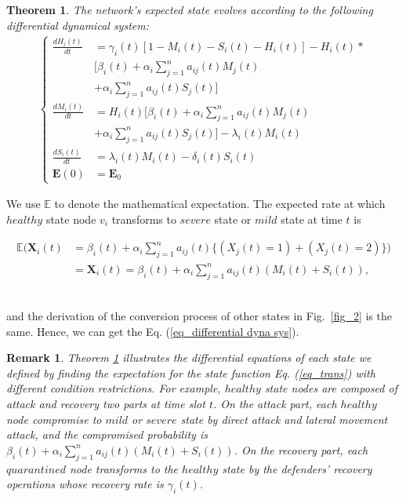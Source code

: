 \documentclass[lettersize,journal]{IEEEtran}
\newtheorem{theorem}{ \textbf{Theorem}}
\newtheorem{remark}{ \textbf{Remark}}
\begin{document}
\begin{theorem}\label{themo_1}
The network's expected state evolves according to the following differential dynamical system:
\begin{equation}\label{eq_differential dyna sys}
\begin{aligned}
 \begin{cases}
     \frac{dH_i(t)}{dt}&=\gamma_i(t)[1-M_i(t)-S_i(t)-H_i(t)]- H_i(t)* \\
     & [\beta_i(t)+\alpha_i\sum_{j=1}^na_{ij}(t)M_j(t)\\
     &+\alpha_i\sum_{j=1}^na_{ij}(t)S_j(t)]  \\
     \frac{dM_i(t)}{dt}&=H_i(t)[\beta_i(t)+\alpha_i\sum_{j=1}^na_{ij}(t)M_j(t)\\
     &+\alpha_i\sum_{j=1}^na_{ij}(t)S_j(t)]-\lambda_i(t)M_i(t) \\
     \frac{dS_i(t)}{dt}&=\lambda_i(t)M_i(t)-\delta_i(t)S_i(t)\\
     \bm{E}(0)&=\bm{E}_0
 \end{cases}
   \end{aligned}
\end{equation}
\end{theorem}
\begin{IEEEproof}
We use $\mathbb{E}$ to denote the mathematical expectation. The expected rate at which $healthy$ state node $v_i$ transforms to $severe$ state or $mild$ state at time $t$ is
\begin{small}
\begin{equation}
\begin{aligned}
    \mathbb{E}\biggl( \bm{X}_i(t)&=\beta_i(t)+\alpha_i\sum_{j=1}^na_{ij}(t)\{(X_j(t)=1)+(X_j(t)=2)\} \biggr)\\
    &= \bm{X}_i(t)=\beta_i(t)+\alpha_i\sum_{j=1}^na_{ij}(t)(M_i(t)+S_i(t)),
\end{aligned}
\end{equation}
\end{small} 
\\and the derivation of the conversion process of other states in Fig.~\ref{fig_2} is the same. Hence, we can get the Eq. (\ref{eq_differential dyna sys}).
\end{IEEEproof}
\begin{remark}
Theorem \ref{themo_1} illustrates the differential equations of each state we defined by finding the expectation for the state function Eq. (\ref{eq_trans}) with different condition restrictions. For example, $healthy$ state nodes are composed of attack and recovery two parts at time slot $t$. On the attack part, each $healthy$ node compromise to $mild$ or $severe$ state by direct attack and lateral movement attack, and the compromised probability is $\beta_i(t)+\alpha_i\sum_{j=1}^na_{ij}(t)(M_i(t)+S_i(t))$. On the recovery part, each $quarantined$ node transforms to the $healthy$ state by the defenders' recovery operations whose recovery rate is $\gamma_i(t)$. 
\end{remark}
\end{document}
